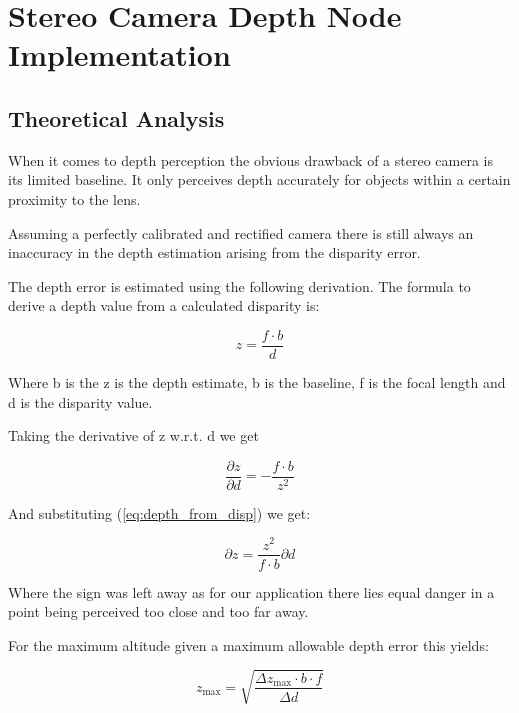 \chapter{Stereo Camera Depth Node Implementation}
\label{chapter:stereo_camera_depth}

\section{Theoretical Analysis}\label{subsec:theoretical_analysis}

When it comes to depth perception the obvious drawback of a stereo camera is its limited baseline. It only perceives depth accurately for objects within a certain proximity to the lens. 

Assuming a perfectly calibrated and rectified camera there is still always an inaccuracy in the depth estimation arising from the disparity error.

The depth error is estimated using the following derivation. The formula to derive a depth value from a calculated disparity is:

\begin{equation}\label{eq:depth_from_disp}
    z = \frac{f \cdot b}{d}
\end{equation}

Where b is the z is the depth estimate, b is the baseline, f is the focal length and d is the disparity value.

Taking the derivative of z w.r.t. d we get

\begin{equation}
    \frac{\partial z}{\partial d} = - \frac{f  \cdot b}{z^2}
\end{equation}

And substituting (\cref{eq:depth_from_disp}) we get:

\begin{equation}
    {\partial z} = \frac{z^2}{f  \cdot b}\partial d
\end{equation}

Where the sign was left away as for our application there lies equal danger in a point being perceived too close and too far away.

For the maximum altitude given a maximum allowable depth error this yields:

\begin{equation}
    z_{\text{max}} = \sqrt{\frac{\Delta z_{\text{max}} \cdot b \cdot f}{\Delta d}}
\end{equation}

